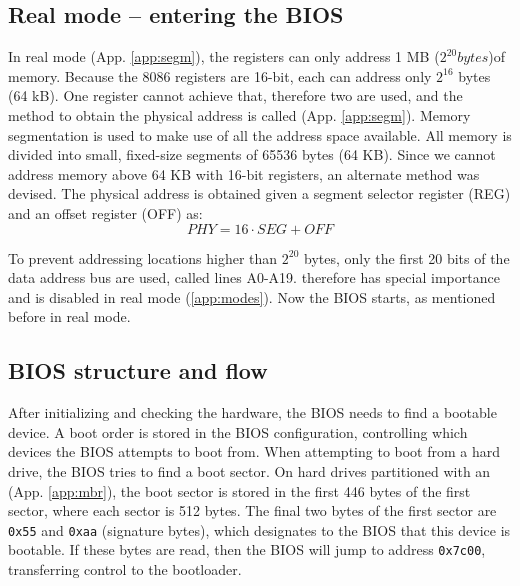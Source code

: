\documentclass[a4paper]{article}
\begin{document}
\subsection{Real mode -- entering the BIOS}
In real mode (App. \ref{app:segm}), the registers can only address 1 MB ($2^{20} bytes$)of memory. Because the 8086 registers are 16-bit, each can address only $2^{16}$ bytes (64 kB). One register cannot achieve that, therefore two are used, and the method to obtain the physical address is called  (App. \ref{app:segm}). Memory segmentation is used to make use of all the address space available. All memory is divided into small, fixed-size segments of 65536 bytes (64 KB). Since we cannot address memory above 64 KB with 16-bit registers, an alternate method was devised. The physical address is obtained given a segment selector register (REG) and an offset register (OFF) as:
\begin{equation}
	PHY=16\cdot SEG + OFF
\end{equation}

To prevent addressing locations higher than $2^{20}$ bytes, only the first 20 bits of the data address bus are used, called lines A0-A19.  therefore has special importance and is disabled in real mode (\ref{app:modes}). Now the BIOS starts, as mentioned before in real mode.

\subsection{BIOS structure and flow}
After initializing and checking the hardware, the BIOS needs to find a bootable device. A boot order is stored in the BIOS configuration, controlling which devices the BIOS attempts to boot from. When attempting to boot from a hard drive, the BIOS tries to find a boot sector. On hard drives partitioned with an  (App. \ref{app:mbr}), the boot sector is stored in the first 446 bytes of the first sector, where each sector is 512 bytes. The final two bytes of the first sector are \texttt{0x55} and \texttt{0xaa} (signature bytes), which designates to the BIOS that this device is bootable. If these bytes are read, then the BIOS will jump to address \texttt{0x7c00}, transferring control to the bootloader.
\end{document}
